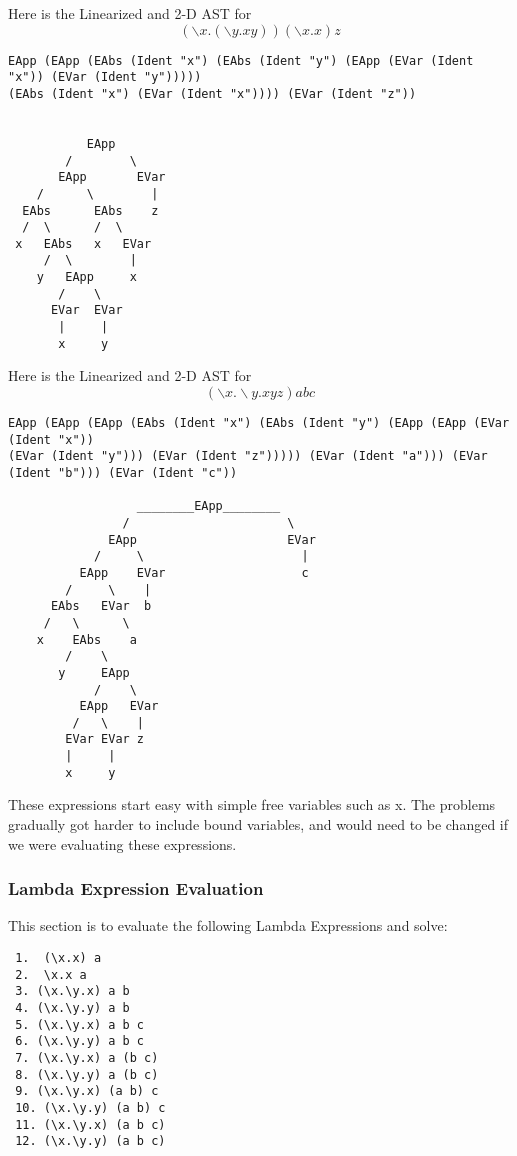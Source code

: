 \documentclass{article}
\theoremstyle{theorem}
\theoremstyle{definition}
\theoremstyle{remark}
\begin{document}
\noindent\newline Here is the Linearized and 2-D AST for $$(\backslash x. (\backslash y . x y)) (\backslash x.x) z$$
\begin{verbatim}
EApp (EApp (EAbs (Ident "x") (EAbs (Ident "y") (EApp (EVar (Ident "x")) (EVar (Ident "y"))))) 
(EAbs (Ident "x") (EVar (Ident "x")))) (EVar (Ident "z"))


           EApp
        /        \
       EApp       EVar
    /      \        |
  EAbs      EAbs    z
  /  \      /  \
 x   EAbs   x   EVar
     /  \        |
    y   EApp     x
       /    \
      EVar  EVar
       |     |
       x     y
\end{verbatim}
\noindent\newline Here is the Linearized and 2-D AST for $$(\backslash x . \backslash y . x y z) a b c$$
\begin{verbatim}
EApp (EApp (EApp (EAbs (Ident "x") (EAbs (Ident "y") (EApp (EApp (EVar (Ident "x")) 
(EVar (Ident "y"))) (EVar (Ident "z"))))) (EVar (Ident "a"))) (EVar (Ident "b"))) (EVar (Ident "c"))

                  ________EApp________
                /                      \
              EApp                     EVar
            /     \                      |
          EApp    EVar                   c
        /     \    |
      EAbs   EVar  b
     /   \      \  
    x    EAbs    a
        /    \
       y     EApp 
            /    \
          EApp   EVar 
         /   \    |
        EVar EVar z
        |     |
        x     y
\end{verbatim}
\noindent\newline\newline These expressions start easy with simple free variables such as x. The problems gradually got harder to include bound variables, and would need to be changed if we were evaluating these expressions.

\subsubsection{Lambda Expression Evaluation}
This section is to evaluate the following Lambda Expressions and solve:
\begin{verbatim}
 1.  (\x.x) a         
 2.  \x.x a           
 3. (\x.\y.x) a b    
 4. (\x.\y.y) a b    
 5. (\x.\y.x) a b c  
 6. (\x.\y.y) a b c  
 7. (\x.\y.x) a (b c)
 8. (\x.\y.y) a (b c)
 9. (\x.\y.x) (a b) c
 10. (\x.\y.y) (a b) c
 11. (\x.\y.x) (a b c)
 12. (\x.\y.y) (a b c)
\end{verbatim}
\end{document}
